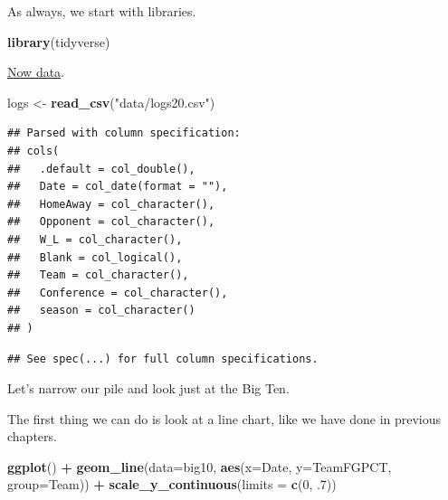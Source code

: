 \documentclass[
]{book}
\newenvironment{Shaded}{\begin{snugshade}}{\end{snugshade}}
\newcommand{\DataTypeTok}[1]{\textcolor[rgb]{0.13,0.29,0.53}{#1}}
\newcommand{\DecValTok}[1]{\textcolor[rgb]{0.00,0.00,0.81}{#1}}
\newcommand{\FloatTok}[1]{\textcolor[rgb]{0.00,0.00,0.81}{#1}}
\newcommand{\KeywordTok}[1]{\textcolor[rgb]{0.13,0.29,0.53}{\textbf{#1}}}
\newcommand{\NormalTok}[1]{#1}
\newcommand{\OperatorTok}[1]{\textcolor[rgb]{0.81,0.36,0.00}{\textbf{#1}}}
\newcommand{\StringTok}[1]{\textcolor[rgb]{0.31,0.60,0.02}{#1}}
\begin{document}
As always, we start with libraries.

\begin{Shaded}
\begin{Highlighting}[]
\KeywordTok{library}\NormalTok{(tidyverse)}
\end{Highlighting}
\end{Shaded}

\href{https://unl.box.com/s/yc01x7ae7r2jtuixo4j3s3s0ed7o5f8g}{Now data}.

\begin{Shaded}
\begin{Highlighting}[]
\NormalTok{logs <-}\StringTok{ }\KeywordTok{read_csv}\NormalTok{(}\StringTok{"data/logs20.csv"}\NormalTok{)}
\end{Highlighting}
\end{Shaded}

\begin{verbatim}
## Parsed with column specification:
## cols(
##   .default = col_double(),
##   Date = col_date(format = ""),
##   HomeAway = col_character(),
##   Opponent = col_character(),
##   W_L = col_character(),
##   Blank = col_logical(),
##   Team = col_character(),
##   Conference = col_character(),
##   season = col_character()
## )
\end{verbatim}

\begin{verbatim}
## See spec(...) for full column specifications.
\end{verbatim}

Let's narrow our pile and look just at the Big Ten.

\begin{Shaded}
\end{Shaded}

The first thing we can do is look at a line chart, like we have done in previous chapters.

\begin{Shaded}
\begin{Highlighting}[]
\KeywordTok{ggplot}\NormalTok{() }\OperatorTok{+}\StringTok{ }
\StringTok{  }\KeywordTok{geom_line}\NormalTok{(}\DataTypeTok{data=}\NormalTok{big10, }\KeywordTok{aes}\NormalTok{(}\DataTypeTok{x=}\NormalTok{Date, }\DataTypeTok{y=}\NormalTok{TeamFGPCT, }\DataTypeTok{group=}\NormalTok{Team)) }\OperatorTok{+}\StringTok{ }
\StringTok{  }\KeywordTok{scale_y_continuous}\NormalTok{(}\DataTypeTok{limits =} \KeywordTok{c}\NormalTok{(}\DecValTok{0}\NormalTok{, }\FloatTok{.7}\NormalTok{))}
\end{Highlighting}
\end{Shaded}
\end{document}
